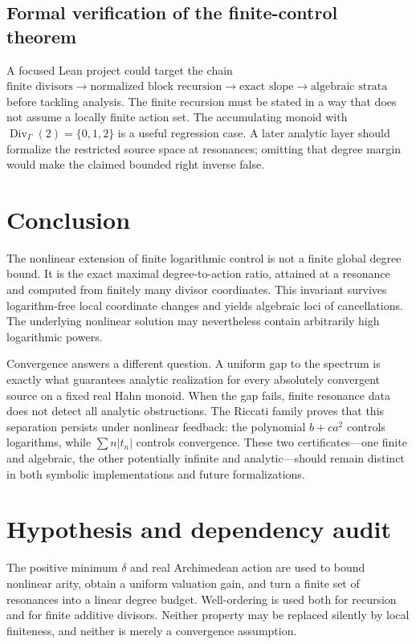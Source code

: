 \documentclass[11pt,a4paper]{article}
\numberwithin{equation}{section}
\theoremstyle{definition}
\theoremstyle{remark}
\newcommand{\G}{\Gamma}
\newcommand{\Div}{\operatorname{Div}}
\begin{document}
\subsection{Formal verification of the finite-control theorem}
A focused Lean project could target the chain
\(\text{finite divisors}\to\text{normalized block recursion}
\to\text{exact slope}\to\text{algebraic strata}\)
before tackling analysis. The finite recursion must be stated in a
way that does not assume a locally finite action set. The
accumulating monoid with \(\Div_\G(2)=\{0,1,2\}\) is a useful
regression case. A later analytic layer should formalize the
restricted source space at resonances; omitting that degree margin
would make the claimed bounded right inverse false.

\section{Conclusion}
The nonlinear extension of finite logarithmic control is not a
finite global degree bound. It is the exact maximal degree-to-action
ratio, attained at a resonance and computed from finitely many
divisor coordinates. This invariant survives logarithm-free local
coordinate changes and yields algebraic loci of cancellations.
The underlying nonlinear solution may nevertheless contain
arbitrarily high logarithmic powers.

Convergence answers a different question. A uniform gap to the
spectrum is exactly what guarantees analytic realization for every
absolutely convergent source on a fixed real Hahn monoid. When the
gap fails, finite resonance data does not detect all analytic
obstructions. The Riccati family proves that this separation
persists under nonlinear feedback: the polynomial \(b+ca^2\)
controls logarithms, while \(\sum n|t_n|\) controls convergence.
These two certificates---one finite and algebraic, the other
potentially infinite and analytic---should remain distinct in both
symbolic implementations and future formalizations.

\appendix
\section{Hypothesis and dependency audit}
\label{app:audit}

The positive minimum \(\delta\) and real Archimedean action are used
to bound nonlinear arity, obtain a uniform valuation gain, and turn
a finite set of resonances into a linear degree budget. Well-ordering
is used both for recursion and for finite additive divisors. Neither
property may be replaced silently by local finiteness, and neither
is merely a convergence assumption.
\end{document}
